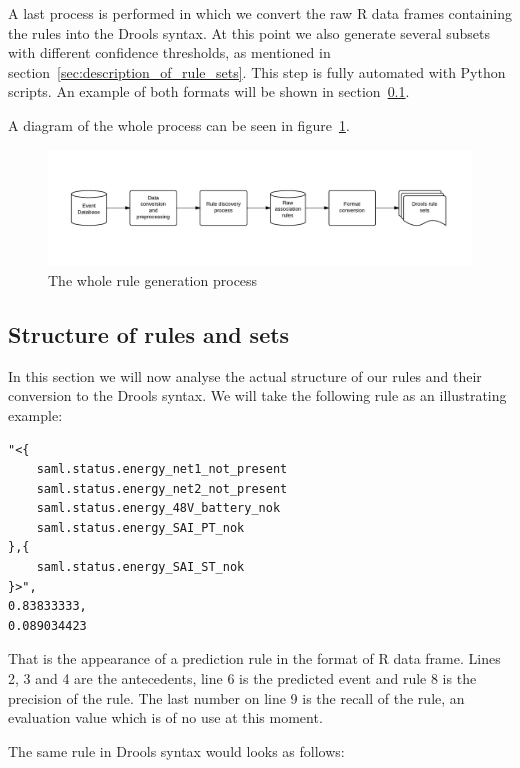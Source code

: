 A last process is performed in which we convert the raw R data frames\cite{ihaka1996r} containing the rules into the Drools syntax. At this point we also generate several subsets with different confidence thresholds, as mentioned in section~\ref{sec:description_of_rule_sets}. This step is fully automated with Python\cite{sanner1999python} scripts. An example of both formats will be shown in section~\ref{sec:structure_of_rules_and_sets}.

A diagram of the whole process can be seen in figure~\ref{fig:prototypeGenProcess}.

\begin{figure}[hbtp]
\includegraphics[width=\textwidth]{img/prototypeGenProcess.pdf}
\caption{The whole rule generation process} \label{fig:prototypeGenProcess}
\end{figure}

\subsection{Structure of rules and sets}
\label{sec:structure_of_rules_and_sets}
In this section we will now analyse the actual structure of our rules and their conversion to the Drools syntax. We will take the following rule as an illustrating example:

\begin{verbatim}
"<{
	saml.status.energy_net1_not_present
	saml.status.energy_net2_not_present
	saml.status.energy_48V_battery_nok
	saml.status.energy_SAI_PT_nok
},{
	saml.status.energy_SAI_ST_nok
}>",
0.83833333,
0.089034423
\end{verbatim}

That is the appearance of a prediction rule in the format of R data frame. Lines 2, 3 and 4 are the antecedents, line 6 is the predicted event and rule 8 is the precision of the rule. The last number on line 9 is the recall of the rule, an evaluation value which is of no use at this moment.

The same rule in Drools syntax would looks as follows:

